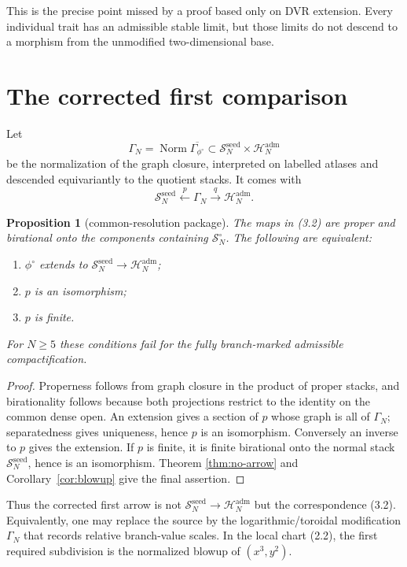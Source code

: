 \documentclass[11pt]{article}
\newtheorem{proposition}[theorem]{Proposition}
\newcommand{\Norm}{\operatorname{Norm}}
\begin{document}
This is the precise point missed by a proof based only on DVR extension.
Every individual trait has an admissible stable limit, but those limits do
not descend to a morphism from the unmodified two-dimensional base.

\section{The corrected first comparison}

Let
\[
 \Gamma_N=\Norm\overline{\Gamma_{\phi^\circ}}
 \subset
 \mathscr S_N^{\mathrm{seed}}\times
 \mathscr H_N^{\mathrm{adm}}                       \tag{3.1}
\]
be the normalization of the graph closure, interpreted on labelled atlases
and descended equivariantly to the quotient stacks.  It comes with
\[
 \mathscr S_N^{\mathrm{seed}}
 \xleftarrow{\ p\ }\Gamma_N
 \xrightarrow{\ q\ }\mathscr H_N^{\mathrm{adm}}.   \tag{3.2}
\]

\begin{proposition}[common-resolution package]\label{prop:graph}
The maps in (3.2) are proper and birational onto the components containing
$\mathscr S_N^\circ$.  The following are equivalent:
\begin{enumerate}
\item $\phi^\circ$ extends to
$\mathscr S_N^{\mathrm{seed}}\to\mathscr H_N^{\mathrm{adm}}$;
\item $p$ is an isomorphism;
\item $p$ is finite.
\end{enumerate}
For $N\ge5$ these conditions fail for the fully branch-marked admissible
compactification.
\end{proposition}

\begin{proof}
Properness follows from graph closure in the product of proper stacks, and
birationality follows because both projections restrict to the identity on
the common dense open.  An extension gives a section of $p$ whose graph is
all of $\Gamma_N$; separatedness gives uniqueness, hence $p$ is an
isomorphism.  Conversely an inverse to $p$ gives the extension.  If $p$ is
finite, it is finite birational onto the normal stack
$\mathscr S_N^{\mathrm{seed}}$, hence is an isomorphism.  Theorem
\ref{thm:no-arrow} and Corollary~\ref{cor:blowup} give the final assertion.
\end{proof}

Thus the corrected first arrow is not
$\mathscr S_N^{\mathrm{seed}}\to\mathscr H_N^{\mathrm{adm}}$ but the
correspondence (3.2).  Equivalently, one may replace the source by the
logarithmic/toroidal modification $\Gamma_N$ that records relative
branch-value scales.  In the local chart (2.2), the first required
subdivision is the normalized blowup of $(x^3,y^2)$.
\end{document}
